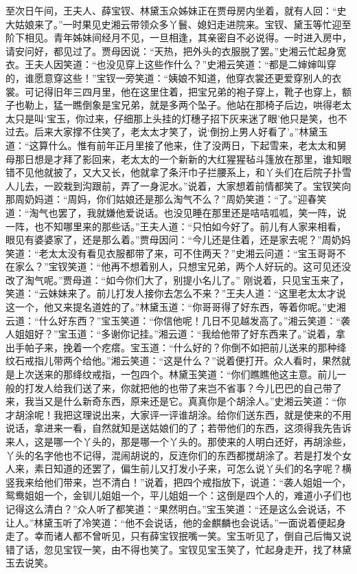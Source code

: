 \documentclass[12pt,oneside]{book}
\begin{document}
至次日午间，王夫人、薛宝钗、林黛玉众姊妹正在贾母房内坐着，就有人回：“史大姑娘来了。”一时果见史湘云带领众多丫鬟、媳妇走进院来。宝钗、黛玉等忙迎至阶下相见。青年姊妹间经月不见，一旦相逢，其亲密自不必说得。一时进入房中，请安问好，都见过了。贾母因说：“天热，把外头的衣服脱了罢。”史湘云忙起身宽衣。王夫人因笑道：“也没见穿上这些作什么？”史湘云笑道：“都是二婶婶叫穿的，谁愿意穿这些！”宝钗一旁笑道：“姨娘不知道，他穿衣裳还更爱穿别人的衣裳。可记得旧年三四月里，他在这里住着，把宝兄弟的袍子穿上，靴子也穿上，额子也勒上，猛一瞧倒象是宝兄弟，就是多两个坠子。他站在那椅子后边，哄得老太太只是叫‘宝玉，你过来，仔细那上头挂的灯穗子招下灰来迷了眼’他只是笑，也不过去。后来大家撑不住笑了，老太太才笑了，说‘倒扮上男人好看了’。”林黛玉道：“这算什么。惟有前年正月里接了他来，住了没两日，下起雪来，老太太和舅母那日想是才拜了影回来，老太太的一个新新的大红猩猩毡斗篷放在那里，谁知眼错不见他就披了，又大又长，他就拿了条汗巾子拦腰系上，和丫头们在后院子扑雪人儿去，一跤栽到沟跟前，弄了一身泥水。”说着，大家想着前情都笑了。宝钗笑向那周奶妈道：“周妈，你们姑娘还是那么淘气不么？”周奶笑道：“了。”迎春笑道：“淘气也罢了，我就嫌他爱说话。也没见睡在那里还是咭咭呱呱，笑一阵，说一阵，也不知哪里来的那些话。”王夫人道：“只怕如今好了。前儿有人家来相看，眼见有婆婆家了，还是那么着。”贾母因问：“今儿还是住着，还是家去呢？”周奶妈笑道：“老太太没有看见衣服都带了来，可不住两天？”史湘云问道：“宝玉哥哥不在家么？”宝钗笑道：“他再不想着别人，只想宝兄弟，两个人好玩的。这可见还没改了淘气呢。”贾母道：“如今你们大了，别提小名儿了。”
刚说着，只见宝玉来了，笑道：“云妹妹来了。前儿打发人接你去怎么不来？”王夫人道：“这里老太太才说这一个，他又来提名道姓的了。”林黛玉道：“你哥哥得了好东西，等着你呢。”史湘云道：“什么好东西？”宝玉笑道：“你信他呢！几日不见越发高了。”湘云笑道：“袭人姐姐好？”宝玉道：“多谢你记挂。”湘云道：“我给他带了好东西来了。”说着，拿出手帕子来，挽着一个疙瘩。宝玉道：“什么好的？你倒不如把前儿送来的那种绛纹石戒指儿带两个给他。”湘云笑道：“这是什么？”说着便打开。众人看时，果然就是上次送来的那绛纹戒指，一包四个。林黛玉笑道：“你们瞧瞧他这主意。前儿一般的打发人给我们送了来，你就把他的也带了来岂不省事？今儿巴巴的自己带了来，我当又是什么新奇东西，原来还是它。真真你是个胡涂人。”史湘云笑道：“你才胡涂呢！我把这理说出来，大家评一评谁胡涂。给你们送东西，就是使来的不用说话，拿进来一看，自然就知是送姑娘们的了；若带他们的东西，这须得我先告诉来人，这是哪一个丫头的，那是哪一个丫头的。那使来的人明白还好，再胡涂些，丫头的名字他也不记得，混闹胡说的，反连你们的东西都搅胡涂了。若是打发个女人来，素日知道的还罢了，偏生前儿又打发小子来，可怎么说丫头们的名字呢？横竖我来给他们带来，岂不清白！”说着，把四个戒指放下，说道：“袭人姐姐一个，鸳鸯姐姐一个，金钏儿姐姐一个，平儿姐姐一个：这倒是四个人的，难道小子们也记得这么清白？”众人听了都笑道：“果然明白。”宝玉笑道：“还是这么会说话，不让人。”林黛玉听了冷笑道：“他不会说话，他的金麒麟也会说话。”一面说着便起身走了。幸而诸人都不曾听见，只有薛宝钗抿嘴一笑。宝玉听见了，倒自己后悔又说错了话，忽见宝钗一笑，由不得也笑了。宝钗见宝玉笑了，忙起身走开，找了林黛玉去说笑。
\end{document}
